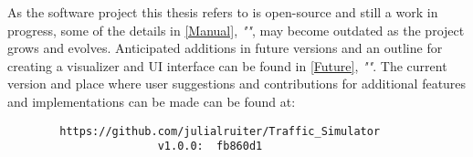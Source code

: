 \par As the software project this thesis refers to is open-source and still a work in progress, some of the details in \autoref{Manual}, \textit{""}, may become outdated as the project grows and evolves.  Anticipated additions in future versions and an outline for creating a visualizer and UI interface can be found in \autoref{Future}, \textit{""}.  The current version and place where user suggestions and contributions for additional features and implementations can be made can be found at:  
\begin{center}
    \begin{verbatim}
        https://github.com/julialruiter/Traffic_Simulator
                       v1.0.0:  fb860d1
    \end{verbatim}
\end{center}


